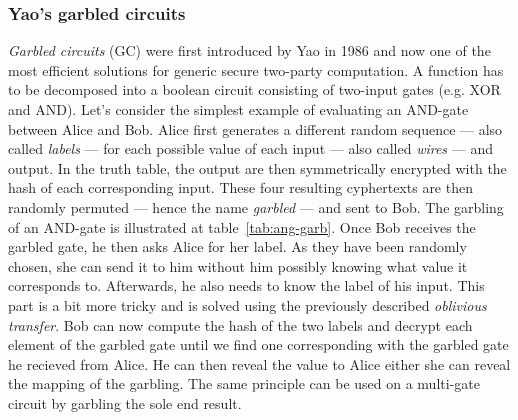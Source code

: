 \subsubsection{Yao's garbled circuits}
\emph{Garbled circuits} (GC) were first introduced by Yao in 1986 \cite{Yao1986HowSecrets} and now one of the most efficient solutions for generic secure two-party computation. A function has to be decomposed into a boolean circuit consisting of two-input gates (e.g. XOR and AND). Let's consider the simplest example of evaluating an AND-gate between Alice and Bob. Alice first generates a different random sequence --- also called \emph{labels} --- for each possible value of each input --- also called \emph{wires} --- and output. In the truth table, the output are then symmetrically encrypted with the hash of each corresponding input. These four resulting cyphertexts are then randomly permuted --- hence the name \emph{garbled} --- and sent to Bob. The garbling of an AND-gate is illustrated at table~\ref{tab:ang-garb}. Once Bob receives the garbled gate, he then asks Alice for her label. As they have been randomly chosen, she can send it to him without him possibly knowing what value it corresponds to. Afterwards, he also needs to know the label of his input. This part is a bit more tricky and is solved using the previously described \emph{oblivious transfer}. Bob can now compute the hash of the two labels and decrypt each element of the garbled gate until we find one corresponding with the garbled gate he recieved from Alice. He can then reveal the value to Alice either she can reveal the mapping of the garbling. The same principle can be used on a multi-gate circuit by garbling the sole end result.

